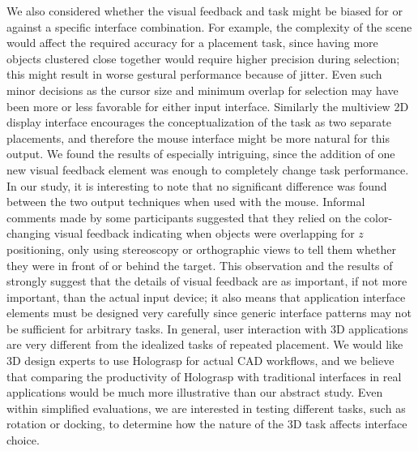 \documentclass[pageno]{jpaper}
\begin{document}
We also
considered whether the visual feedback and task might be biased for or against a specific interface combination. For example, the
complexity of the scene would affect the required accuracy for a placement task, since having more objects clustered close together would require
higher precision during selection; this might result in worse gestural performance because of jitter. Even such minor decisions as the cursor size and minimum overlap
for selection may have been more or less favorable for either input interface. Similarly the multiview 2D display interface
encourages the conceptualization of the task as two separate placements, and therefore the mouse interface might be more natural for this output.
We found the results of \cite{study2} especially intriguing,
since the addition of one new visual feedback element was enough to completely change task performance. 
In our study, it is interesting to note that no significant difference was found between the two output techniques when used with the mouse. 
Informal comments made by some participants suggested
that they relied on the color-changing visual feedback indicating when objects were overlapping for $z$ positioning, only using stereoscopy or orthographic
views to tell them whether they were in front of or behind the target.
This observation and the results of \cite{study2} strongly suggest that the details
of visual feedback are as important, if not more important, than the actual input device; it also means that application interface elements must be
designed very carefully since generic interface patterns may not be sufficient for arbitrary tasks. In general, user interaction with 3D applications are very different from the idealized tasks
of repeated placement. We would like 3D design experts to use Holograsp for actual CAD workflows, and we believe that comparing the productivity of Holograsp with
traditional interfaces in real applications would be much more illustrative than our abstract study.
Even within simplified evaluations, we are interested in testing different tasks, such as rotation or docking, to determine how the nature of the
3D task affects interface choice.
\end{document}
